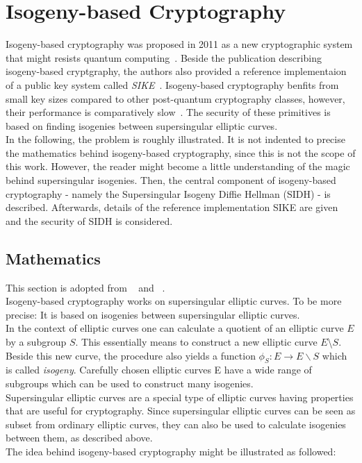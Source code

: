 \section{Isogeny-based Cryptography} \label{sec:isogeny-based_crypto}
Isogeny-based cryptography was proposed in 2011 as a new cryptographic system that might resists quantum computing~\parencite{jao2011towards}. Beside the publication describing isogeny-based cryptgraphy, the authors also provided a reference implementaion of a public key system called \textit{SIKE}~\parencite{sike2020spec}. Isogeny-based cryptography benfits from small key sizes compared to other post-quantum cryptography classes, however, their performance is comparatively slow~\parencite{sike2020spec}. The security of these primitives is based on finding isogenies between supersingular elliptic curves.\\
In the following, the problem is roughly illustrated. It is not indented to precise the mathematics behind isogeny-based cryptography, since this is not the scope of this work. However, the reader might become a little understanding of the magic behind supersingular isogenies. Then, the central component of isogeny-based cryptography - namely the Supersingular Isogeny Diffie Hellman (SIDH) - is described. Afterwards, details of the reference implementation SIKE are given and the security of SIDH is considered.

\subsection{Mathematics}
This section is adopted from ~\parencite{urbanik2017friendly} and ~\parencite{costello2019supersingular}.\\
Isogeny-based cryptography works on supersingular elliptic curves. To be more precise: It is based on isogenies between supersingular elliptic curves.
\\
In the context of elliptic curves one can calculate a quotient of an elliptic curve $E$ by a subgroup $S$. This essentially means to construct a new elliptic curve $E$\textbackslash $S$.
Beside this new curve, the procedure also yields a function $\phi_S: E \to E \backslash S$ which is called \textit{isogeny}. Carefully chosen elliptic curves E have a wide range of subgroups which can be used to construct many isogenies.
\\
Supersingular elliptic curves are a special type of elliptic curves having properties that are useful for cryptography. Since supersingular elliptic curves can be seen as subset from ordinary elliptic curves, they can also be used to calculate isogenies between them, as described above.
\\
The idea behind isogeny-based cryptography might be illustrated as followed:


